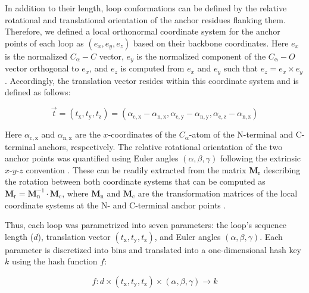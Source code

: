 In addition to their length, loop conformations can be defined by the relative rotational and translational orientation of the anchor residues flanking them. Therefore, we defined a local orthonormal coordinate system for the anchor points of each loop as $(e_x, e_y, e_z)$ based on their backbone coordinates. Here $e_x$ is the normalized $C_{\upalpha}-C$ vector, $e_y$ is the normalized component of the $C_{\upalpha}-O$ vector orthogonal to $e_x$, and $e_z$ is computed from $e_x$ and $e_y$ such that $e_z=e_x×e_y$. Accordingly, the translation vector resides within this coordinate system and is defined as follows: 

\begin{equation}
    \vec{t}=(t_{\mathup{x}},t_{\mathup{y}},t_{\mathup{z}} )=(\alpha_{\mathup{c,x}}-\alpha_{\mathup{n,x}},\alpha_{\mathup{c,y}}-\alpha_{\mathup{n,y}},\alpha_{\mathup{c,z}}-\alpha_{\mathup{n,z}})
\end{equation}

Here $\alpha_{\mathup{c,x}}$ and $\alpha_{\mathup{n,x}}$ are the $x$-coordinates of the $C_{\mathup{\upalpha}}$-atom of the N-terminal and C-terminal anchors, respectively. The relative rotational orientation of the two anchor points was quantified using Euler angles $(\alpha,\beta,\gamma)$ following the extrinsic $x$-$y$-$z$ convention \citep*{Pio1966}. These can be readily extracted from the matrix $\mathbf{M}_{\mathup{r}}$ describing the rotation between both coordinate systems that can be computed as $\mathbf{M}_{\mathup{r}}=\mathbf{M}_{\mathup{n}}^{-1}\cdot \mathbf{M}_{\mathup{c}}$, where $\mathbf{M}_{\mathup{n}}$ and $\mathbf{M}_{\mathup{c}}$ are the transformation matrices of the local coordinate systems at the N- and C-terminal anchor points \citep*{Slabaugh1999}.

Thus, each loop was parametrized into seven parameters: the loop's sequence length ($d$), translation vector $(t_{\mathup{x}},t_{\mathup{y}},t_{\mathup{z}})$, and Euler angles $(\alpha,\beta,\gamma)$. Each parameter is discretized into bins and translated into a one-dimensional hash key $k$ using the hash function $f$:

\begin{equation}
    f:d×(t_{\mathup{x}},t_{\mathup{y}},t_{\mathup{z}} )×(\alpha,\beta,\gamma)\rightarrow k
\label{eq:loophash_hashfxn}
\end{equation}

